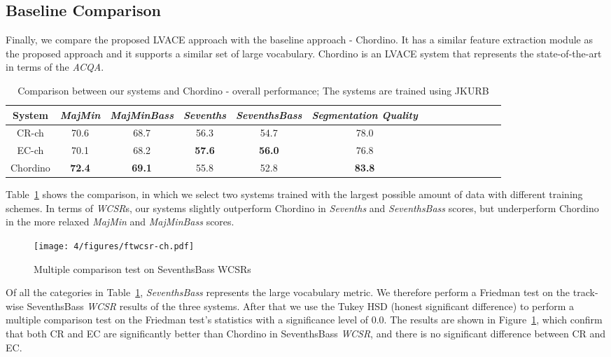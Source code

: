 \subsection{Baseline Comparison}
Finally, we compare the proposed LVACE approach with the baseline approach - Chordino\cite{cannam2013mirex}. It has a similar feature extraction module as the proposed approach and it supports a similar set of large vocabulary. Chordino is an LVACE system that represents the state-of-the-art in terms of the \textit{ACQA}.
\begin{table}[htb]
	\centering
	\scriptsize
	\begin{tabular}{|c|c|c|c|c|c|c|c|c|c|c|c|c|c|}\hline
		System & \textit{MajMin} & \textit{MajMinBass} & \textit{Sevenths} & \textbf{\textit{SeventhsBass}} & \textit{Segmentation Quality}\\ \hline
		CR-ch & 70.6 & 68.7 & 56.3 & 54.7 & 78.0\\ \hline
		EC-ch & 70.1 & 68.2 & \textbf{57.6} & \textbf{56.0} & 76.8\\ \hline
		Chordino & \textbf{72.4} & \textbf{69.1} & 55.8 & 52.8 & \textbf{83.8}\\ \hline
	\end{tabular}
	\caption{Comparison between our systems and Chordino - overall performance; The systems are trained using JKURB}
	\label{tab:4-cpcd}
\end{table}

Table~\ref{tab:4-cpcd} shows the comparison, in which we select two systems trained with the largest possible amount of data with different training schemes. In terms of \textit{WCSR}s, our systems slightly outperform Chordino in \textit{Sevenths} and \textit{SeventhsBass} scores, but underperform Chordino in the more relaxed \textit{MajMin} and \textit{MajMinBass} scores.

\begin{figure}[h!]
	\centering
	\texttt{[image: 4/figures/ftwcsr-ch.pdf]}
	\caption{Multiple comparison test on SeventhsBass WCSRs}
	\label{fig:4-ftwcsr-ch}
\end{figure}
Of all the categories in Table~\ref{tab:4-cpcd}, \textit{SeventhsBass} represents the large vocabulary metric. We therefore perform a Friedman test on the track-wise SeventhsBass \textit{WCSR} results of the three systems. After that we use the Tukey HSD (honest significant difference) to perform a multiple comparison test on the Friedman test's statistics with a significance level of 0.0. The results are shown in Figure~\ref{fig:4-ftwcsr-ch}, which confirm that both CR and EC are significantly better than Chordino in SeventhsBass \textit{WCSR}, and there is no significant difference between CR and EC.

